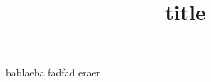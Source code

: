 \documentclass{article}
\title{title}
\begin{document}
\maketitle

bablaeba
fadfad
eraer
\end{document}
